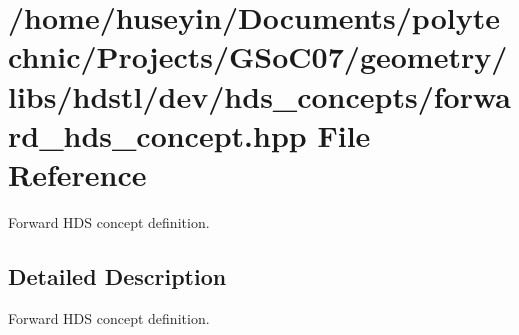 \section{/home/huseyin/Documents/polytechnic/Projects/GSo\-C07/geometry/libs/hdstl/dev/hds\_\-concepts/forward\_\-hds\_\-concept.hpp File Reference}
\label{forward__hds__concept_8hpp}
Forward HDS concept definition. 



\subsection{Detailed Description}
Forward HDS concept definition. 

